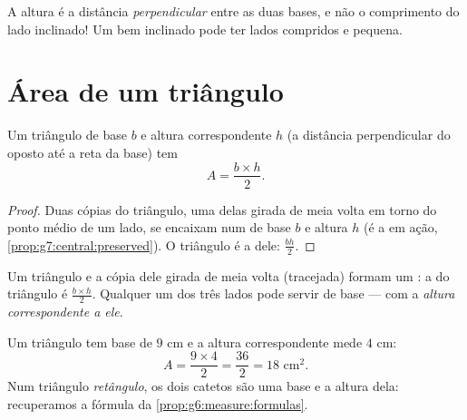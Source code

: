\begin{remark}
A altura é a distância \emph{perpendicular} entre as duas bases, e não
o comprimento do lado inclinado! Um  bem inclinado pode
ter lados compridos e  pequena.
\end{remark}

\section{Área de um triângulo}

\begin{theorem}[Triângulo]\label{thm:g7:areas:triangle}
Um triângulo de base $b$ e altura correspondente $h$ (a distância
perpendicular do  oposto até a reta da base) tem 
\[
A = \frac{b \times h}{2} .
\]
\end{theorem}

\begin{proof}
Duas cópias do triângulo, uma delas girada de meia volta em torno do
ponto médio de um lado, se encaixam num  de base $b$ e
altura $h$ (é a  em ação,
\cref{prop:g7:central:preserved}). O triângulo é a  dele:
$\frac{bh}{2}$.
\end{proof}

\begin{omfigure}

{\small Um triângulo e a cópia dele girada de meia volta (tracejada)
formam um : a  do triângulo é
$\frac{b\times h}{2}$. Qualquer um dos três lados pode servir de base
--- com a \emph{altura correspondente a ele}.}
\end{omfigure}

\begin{example}\label{ex:g7:areas:triangle}
Um triângulo tem base de $9$ cm e a altura correspondente mede $4$ cm:
\[
A = \frac{9 \times 4}{2} = \frac{36}{2} = 18 \text{ cm}^2 .
\]
Num triângulo \emph{retângulo}, os dois catetos são uma base e a
altura dela: recuperamos a fórmula da
\cref{prop:g6:measure:formulas}.
\end{example}

